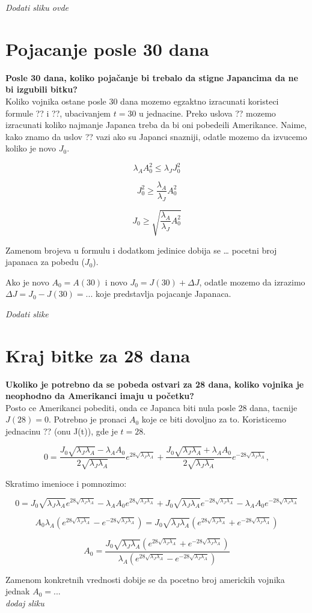 \documentclass{article}
\newcommand{\laj}{\sqrt{\lambda_J\lambda_A}}
\begin{document}
\emph{Dodati sliku ovde}

\section*{Pojacanje posle 30 dana}

\textbf{Posle 30 dana, koliko pojačanje bi trebalo da stigne Japancima da ne bi
izgubili bitku?} \\

Koliko vojnika ostane posle 30 dana mozemo egzaktno izracunati koristeci
formule ?? i ??, ubacivanjem \(t = 30\) u jednacine. Preko uslova ??
mozemo izracunati koliko najmanje Japanca treba da bi oni pobedeili
Amerikance. Naime, kako znamo da uslov ?? vazi ako su Japanci snazniji,
odatle mozemo da izvucemo koliko je novo \(J_0\).

\[
  \lambda_{A}A_0^2 \leq \lambda_{J}J_0^2
\]

\[
  J_0^2 \geq \frac{\lambda_A}{\lambda_J} A_0^2
\]

\[
  J_0 \geq \sqrt{\frac{\lambda_A}{\lambda_J} A_0^2}
\]

Zamenom brojeva u formulu i dodatkom jedinice dobija se \ldots{} pocetni
broj japanaca za pobedu (\(J_0\)).

Ako je novo \(A_0 = A(30)\) i novo \(J_0 = J(30) + \Delta J\), odatle
mozemo da izrazimo \(\Delta J = J_0 - J(30) = ...\) koje predstavlja
pojacanje Japanaca.

\emph{Dodati slike}

\section*{Kraj bitke za 28 dana}

\textbf{Ukoliko je potrebno da se pobeda ostvari za 28 dana, koliko
vojnika je neophodno da Amerikanci imaju u
početku?} \\

Posto ce Amerikanci pobediti, onda ce Japanca biti nula posle 28 dana,
tacnije \(J(28) = 0\). Potrebno je pronaci \(A_0\) koje ce biti dovoljno
za to. Koristicemo jednacinu ?? (onu J(t)), gde je \(t = 28\).

\[
0 = \frac{J_0 \laj - \lambda_A A_0}{2\laj} e^{28 \laj } +
    \frac{J_0 \laj + \lambda_A A_0}{2 \laj } e^{-28 \laj },
\]

Skratimo imenioce i pomnozimo:

\[
  0 = J_0 \laj e^{28 \laj } - \lambda_A A_0 e^{28 \laj} +
  J_0 \laj e^{-28 \laj} - \lambda_A A_0 e^{-28 \laj}
\]

\[
  A_0 \lambda_A (e^{28 \laj} - e^{-28 \laj})
=
  J_0 \laj(e^{28 \laj} + e^{-28 \laj})
\]

\[
  A_0 =
  \frac{J_0 \laj(e^{28 \laj} + e^{-28 \laj})}
  {\lambda_A (e^{28 \laj} - e^{-28 \laj})}
\]

Zamenom konkretnih vrednosti dobije se da pocetno broj americkih vojnika
jednak \(A_0 = ...\) \\

\emph{dodaj sliku}
\end{document}
